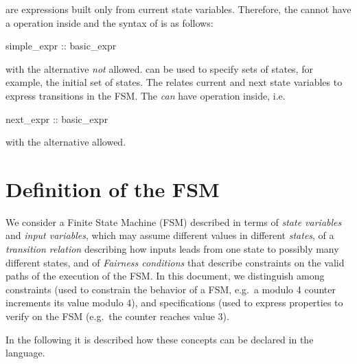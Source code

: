  are expressions built only from current
state variables. 
%
Therefore, the  cannot have a
 operation inside and the syntax of
 is as follows:
%
\begin{Grammar}
simple_expr :: basic_expr
\end{Grammar}
%
with the alternative  \emph{not}
allowed. 
%
 can be used to specify sets of states,
for example, the initial set of states.
%
The  relates current and next state
variables to express transitions in the FSM. 
%
The  \emph{can} have 
operation inside, i.e.
%
\begin{Grammar}
next_expr :: basic_expr
\end{Grammar}
%
with the alternative  allowed.
%
%



\section{Definition of the FSM}
\label{Definition of the FSM}

We consider a Finite State Machine (FSM) described in terms of
\emph{state variables} and \emph{input variables}, which may assume
different values in different \emph{states}, of a \emph{transition
relation} describing how inputs leads from one state to possibly many
different states, and of \emph{Fairness conditions} that describe
constraints on the valid paths of the execution of the FSM.
%
In this document, we distinguish among constraints (used to constrain
the behavior of a FSM, e.g.\ a modulo 4 counter increments its value
modulo 4), and specifications (used to express properties to verify on
the FSM (e.g.\ the counter reaches value 3).

In the following it is described how these concepts can be declared in
the \nusmv language.

